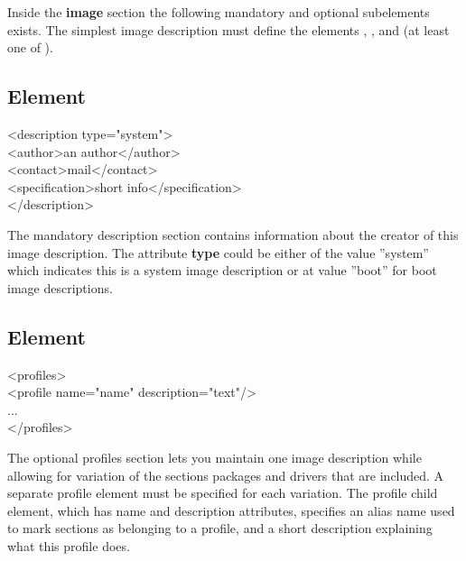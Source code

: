 Inside the \textbf{image} section the following mandatory and optional
subelements exists. The simplest image description must define the
elements , , 
 and  (at least one of 
).

\subsection{ Element}
\begin{Command}{12cm}
<description type="system">\\
\hspace*{1cm}<author>an author</author>\\
\hspace*{1cm}<contact>mail</contact>\\
\hspace*{1cm}<specification>short info</specification>\\
</description>
\end{Command}

The mandatory description section contains information about
the creator of this image description. The attribute \textbf{type}
could be either of the value ''system'' which indicates this is a
system image description or at value ''boot'' for boot image
descriptions.

\subsection{ Element}
\begin{Command}{12cm}
<profiles>\\
\hspace*{1cm}<profile name="name" description="text"/>\\
\hspace*{1cm}...\\
</profiles>
\end{Command}

The optional profiles section lets you maintain one image description
while allowing for variation of the sections packages and drivers that are
included. A separate profile element must be specified for each variation.
The profile child element, which has name and description attributes,
specifies an alias name used to mark sections as belonging to a profile,
and a short description explaining what this profile does.

